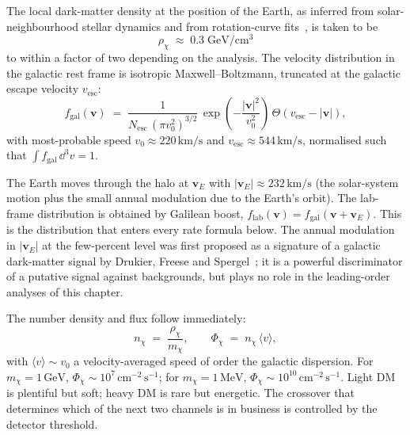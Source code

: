 \begin{statement}
\label{stmt:halo}
The local dark-matter density at the position of the Earth, as
inferred from solar-neighbourhood stellar dynamics and from
rotation-curve fits~\cite{read2014,catena2010}, is taken to be
\begin{equation}
\label{eq:rho-chi}
\rho_\chi \;\approx\; 0.3\;\text{GeV}/\text{cm}^3
\end{equation}
to within a factor of two depending on the analysis. The velocity
distribution in the galactic rest frame is isotropic
Maxwell--Boltzmann, truncated at the galactic escape
velocity $v_\text{esc}$:
\begin{equation}
\label{eq:halo-distribution}
f_\text{gal}(\bm v) \;=\; \frac{1}{N_\text{esc}\,(\pi v_0^2)^{3/2}}\,
\exp\!\left(-\frac{|\bm v|^2}{v_0^2}\right)\,\Theta\!\left(v_\text{esc}-|\bm v|\right),
\end{equation}
with most-probable speed $v_0\approx 220\,\text{km}/\text{s}$ and
$v_\text{esc}\approx 544\,\text{km}/\text{s}$, normalised such that
$\int f_\text{gal}\,\dd^3v=1$.
\end{statement}

\begin{remark}
The Earth moves through the halo at
$\bm v_E$ with $|\bm v_E|\approx 232\,\text{km}/\text{s}$ (the
solar-system motion plus the small annual modulation due to the
Earth's orbit). The lab-frame distribution is obtained by Galilean
boost,
$f_\text{lab}(\bm v)=f_\text{gal}(\bm v+\bm v_E)$. This is the
distribution that enters every rate formula below. The annual
modulation in $|\bm v_E|$ at the few-percent level was first
proposed as a signature of a galactic dark-matter signal by
Drukier, Freese and Spergel~\cite{drukier1986}; it is a powerful
discriminator of a putative signal against backgrounds, but
plays no role in the leading-order analyses of this chapter.
\end{remark}

The number density and flux follow immediately:
\begin{equation}
\label{eq:flux}
n_\chi \;=\; \frac{\rho_\chi}{m_\chi},
\qquad
\Phi_\chi \;=\; n_\chi\,\langle v\rangle,
\end{equation}
with $\langle v\rangle\sim v_0$ a velocity-averaged speed of order
the galactic dispersion. For $m_\chi=1\,\text{GeV}$, $\Phi_\chi\sim
10^7\,\text{cm}^{-2}\,\text{s}^{-1}$; for $m_\chi=1\,\text{MeV}$,
$\Phi_\chi\sim 10^{10}\,\text{cm}^{-2}\,\text{s}^{-1}$. Light DM is
plentiful but soft; heavy DM is rare but energetic. The crossover
that determines which of the next two channels is in business is
controlled by the detector threshold.

